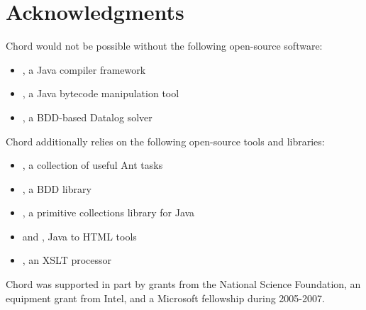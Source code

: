 \section{Acknowledgments}
\label{sec:acknowledgments}

Chord would not be possible without the following open-source software:

\begin{itemize}
\item
{}, a Java compiler framework
\item
{},
a Java bytecode manipulation tool
\item
{}, a BDD-based Datalog solver
\end{itemize}

Chord additionally relies on the following open-source tools and libraries:
\begin{itemize}
\item
{},
a collection of useful Ant tasks  
\item
{}, a BDD library
\item
{},
a primitive collections library for Java
\item
{} and
, Java to HTML tools
\item
{}, an XSLT processor
\end{itemize}

\noindent Chord was supported in part by grants from the National Science Foundation,
an equipment grant from Intel, and a Microsoft fellowship during 2005-2007.

